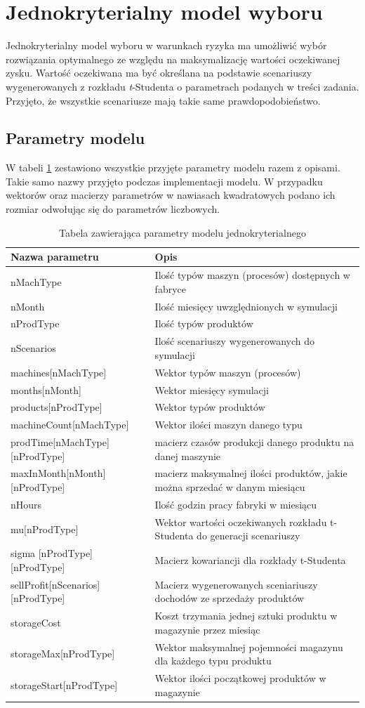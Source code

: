 \documentclass[11pt,a4paper]{article}
\begin{document}
\section{Jednokryterialny model wyboru}
Jednokryterialny model wyboru w warunkach ryzyka ma umożliwić wybór rozwiązania optymalnego ze względu na maksymalizację wartości oczekiwanej zysku. Wartość oczekiwana ma być określana na podstawie scenariuszy wygenerowanych z rozkładu \textit{t}-Studenta o parametrach podanych w treści zadania. Przyjęto, że wszystkie scenariusze mają takie same prawdopodobieństwo.
\subsection{Parametry modelu}
W tabeli \ref{tab:param} zestawiono wszystkie przyjęte parametry modelu razem z opisami. Takie samo nazwy przyjęto podczas implementacji modelu. W przypadku wektorów oraz macierzy parametrów w nawiasach kwadratowych podano ich rozmiar odwołując się do parametrów liczbowych.
\begin{table}[ht!]
\caption{Tabela zawierająca parametry modelu jednokryterialnego}
\label{tab:param}
\begin{tabular}{lp{9cm}}
	\hline
	Nazwa parametru      & Opis \\
	\hline
	nMachType & Ilość typów maszyn (procesów) dostępnych w fabryce \\
nMonth & Ilość miesięcy uwzględnionych w symulacji  \\
nProdType & Ilość typów produktów \\
nScenarios & Ilość scenariuszy wygenerowanych do symulacji \\
machines[nMachType] & Wektor typów maszyn (procesów)\\
months[nMonth] & Wektor miesięcy symulacji\\
products[nProdType] & Wektor typów produktów\\
machineCount[nMachType] & Wektor ilości maszyn danego typu\\
prodTime[nMachType][nProdType] & macierz czasów produkcji danego produktu na danej maszynie \\
maxInMonth[nMonth][nProdType] & macierz maksymalnej ilości produktów, jakie można sprzedać w danym miesiącu\\
nHours & Ilość godzin pracy fabryki w miesiącu\\
mu[nProdType] & Wektor wartości oczekiwanych rozkładu t-Studenta do generacji scenariuszy\\
sigma [nProdType][nProdType] & Macierz kowariancji dla rozkłady t-Studenta\\ 
sellProfit[nScenarios][nProdType] & Macierz wygenerowanych sceniariuszy dochodów ze sprzedaży produktów\\
storageCost & Koszt trzymania jednej sztuki produktu w magazynie przez miesiąc \\
storageMax[nProdType] & Wektor maksymalnej pojemności magazynu dla każdego typu produktu \\
storageStart[nProdType] & Wektor ilości początkowej produktów w magazynie \\
	\hline
\end{tabular}
\end{table}
\end{document}
